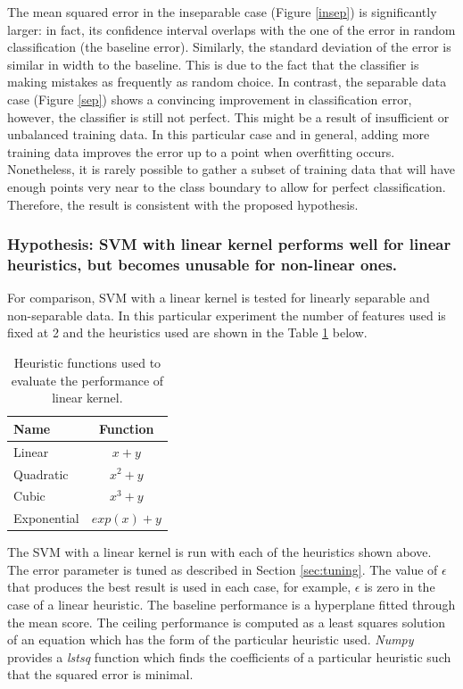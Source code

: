 \documentclass[12pt,notitlepage,twoside]{scrbook}
\begin{document}
The mean squared error in the inseparable case (Figure \ref{insep}) is significantly larger: in fact, its
confidence interval overlaps with the one of the error in random classification (the
baseline error). Similarly, the standard deviation of the error is similar in width to the
baseline. This is due to the fact that the classifier is making mistakes as frequently as random choice. In
contrast, the separable data case (Figure \ref{sep}) shows a convincing improvement in classification error,
however, the classifier is still not perfect. This might be a result of insufficient
or unbalanced training data. In this particular case and in general, adding more training
data improves the error up to a point when overfitting occurs. Nonetheless, it is rarely
possible to gather a subset of training data that will have enough points very near to the class
boundary to allow for perfect classification. Therefore, the result is consistent with the
proposed hypothesis.
\subsubsection*{Hypothesis: SVM with linear kernel performs well for linear heuristics, but becomes
unusable for non-linear ones.}


For comparison, SVM with a linear kernel is tested for linearly separable and
non-separable data. In this particular experiment the number of features used is fixed at
2 and the heuristics used are shown in the Table \ref{linkern} below. 

\begin{table}[h!]
	\centering
	\begin{tabular}[h!]{l|c}
		\hline
		Name & Function \\ \hline
		Linear & \(x+y\)\\ \hline
		Quadratic & \(x^2+y\)\\ \hline
		Cubic & \(x^3+y\)\\ \hline
		Exponential & \(exp(x)+y\)\\ \hline
	\end{tabular}
	\caption{Heuristic functions used to evaluate the performance of linear kernel.
		\label{linkern}}
\end{table}

The SVM with a linear kernel is run with each of the heuristics shown above. The error
parameter is tuned as described in Section \ref{sec:tuning}. The value of $\epsilon$ that produces
the best result is used in each case, for example, $\epsilon$ is zero in the
case of a linear heuristic. The baseline performance is a hyperplane fitted through the
mean score. The ceiling performance is computed as a least squares solution of an equation
which has the form of the particular heuristic used. \textit{Numpy} provides a
\textit{lstsq} function which finds the coefficients of a particular heuristic such that
the squared error is minimal.
\end{document}
